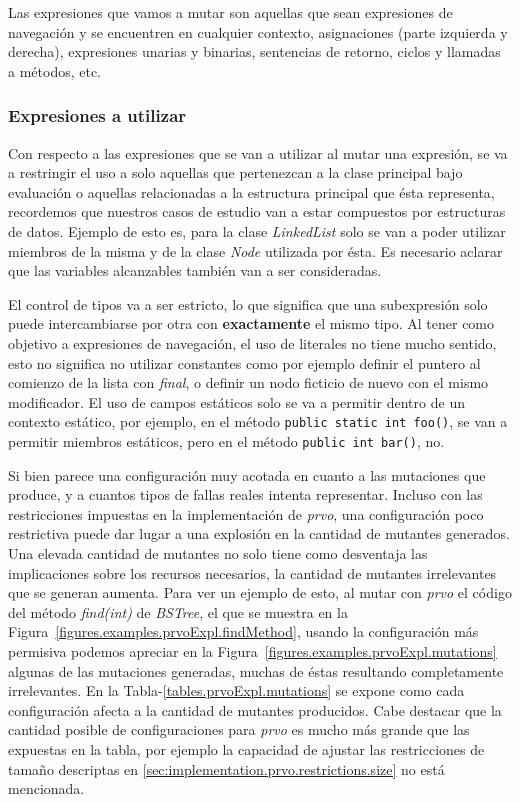 Las expresiones que vamos a mutar son aquellas que sean expresiones de navegaci\'on y se encuentren en cualquier contexto, asignaciones (parte izquierda y derecha), expresiones unarias y binarias, sentencias de retorno, ciclos y llamadas a m\'etodos, etc.

\subsubsection{Expresiones a utilizar}

Con respecto a las expresiones que se van a utilizar al mutar una expresi\'on, se va a restringir el uso a solo aquellas que pertenezcan a la clase principal bajo evaluaci\'on o aquellas relacionadas a la estructura principal que \'esta representa, recordemos que nuestros casos de estudio van a estar compuestos por estructuras de datos. Ejemplo de esto es, para la clase \emph{LinkedList} solo se van a poder utilizar miembros de la misma y de la clase \emph{Node} utilizada por \'esta. Es necesario aclarar que las variables alcanzables tambi\'en van a ser consideradas.

El control de tipos va a ser estricto, lo que significa que una subexpresi\'on solo puede intercambiarse por otra con \textbf{exactamente} el mismo tipo. Al tener como objetivo a expresiones de navegaci\'on, el uso de literales no tiene mucho sentido, esto no significa no utilizar constantes como por ejemplo definir el puntero al comienzo de la lista con \emph{final}, o definir un nodo ficticio de nuevo con el mismo modificador. El uso de campos est\'aticos solo se va a permitir dentro de un contexto est\'atico, por ejemplo, en el m\'etodo \lstinline|public static int foo()|, se van a permitir miembros est\'aticos, pero en el m\'etodo \lstinline|public int bar()|, no.

Si bien parece una configuraci\'on muy acotada en cuanto a las mutaciones que produce, y a cuantos tipos de fallas reales intenta representar. Incluso con las restricciones impuestas en la implementaci\'on de \emph{prvo}, una configuraci\'on poco restrictiva puede dar lugar a una explosi\'on en la cantidad de mutantes generados. Una elevada cantidad de mutantes no solo tiene como desventaja las implicaciones sobre los recursos necesarios, la cantidad de mutantes irrelevantes que se generan aumenta. Para ver un ejemplo de esto, al mutar con \emph{prvo} el c\'odigo del m\'etodo \emph{find(int)} de \emph{BSTree}, el que se muestra en la Figura~\ref{figures.examples.prvoExpl.findMethod}, usando la configuraci\'on m\'as permisiva podemos apreciar en la Figura~\ref{figures.examples.prvoExpl.mutations} algunas de las mutaciones generadas, muchas de \'estas resultando completamente irrelevantes. En la Tabla-\ref{tables.prvoExpl.mutations} se expone como cada configuraci\'on afecta a la cantidad de mutantes producidos. Cabe destacar que la cantidad posible de configuraciones para \emph{prvo} es mucho m\'as grande que las expuestas en la tabla, por ejemplo la capacidad de ajustar las restricciones de tama\~no descriptas en \ref{sec:implementation.prvo.restrictions.size} no est\'a mencionada.

